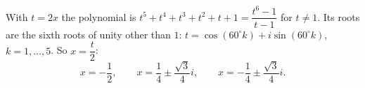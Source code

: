 With $t=2x$ the polynomial is $t^5+t^4+t^3+t^2+t+1=\dfrac{t^6-1}{t-1}$ for $t\ne1$. Its roots are the sixth roots of unity other than $1$: $t=\cos(60^\circ k)+i\sin(60^\circ k)$, $k=1,\dots,5$. So $x=\dfrac t2$:
\[x=-\dfrac12,\qquad x=\dfrac14\pm\dfrac{\sqrt3}4i,\qquad x=-\dfrac14\pm\dfrac{\sqrt3}4i.\]
